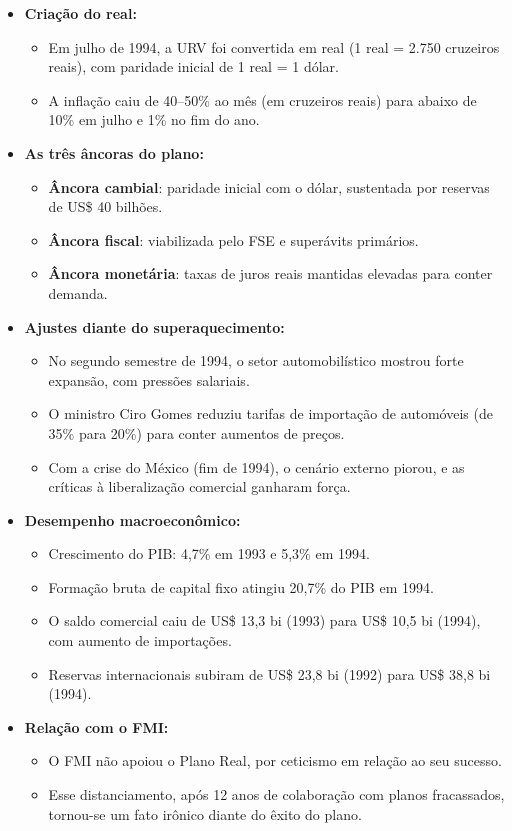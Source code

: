 \documentclass[a4paper,12pt]{article}[abntex2]
\begin{document}
\begin{itemize}
    \item \textbf{Criação do real:}
    \begin{itemize}
        \item Em julho de 1994, a URV foi convertida em real (1 real = 2.750 cruzeiros reais), com paridade inicial de 1 real = 1 dólar.
        \item A inflação caiu de 40--50\% ao mês (em cruzeiros reais) para abaixo de 10\% em julho e 1\% no fim do ano.
    \end{itemize}

    \item \textbf{As três âncoras do plano:}
    \begin{itemize}
        \item \textbf{Âncora cambial}: paridade inicial com o dólar, sustentada por reservas de US\$ 40 bilhões.
        \item \textbf{Âncora fiscal}: viabilizada pelo FSE e superávits primários.
        \item \textbf{Âncora monetária}: taxas de juros reais mantidas elevadas para conter demanda.
    \end{itemize}

    \item \textbf{Ajustes diante do superaquecimento:}
    \begin{itemize}
        \item No segundo semestre de 1994, o setor automobilístico mostrou forte expansão, com pressões salariais.
        \item O ministro Ciro Gomes reduziu tarifas de importação de automóveis (de 35\% para 20\%) para conter aumentos de preços.
        \item Com a crise do México (fim de 1994), o cenário externo piorou, e as críticas à liberalização comercial ganharam força.
    \end{itemize}

    \item \textbf{Desempenho macroeconômico:}
    \begin{itemize}
        \item Crescimento do PIB: 4,7\% em 1993 e 5,3\% em 1994.
        \item Formação bruta de capital fixo atingiu 20,7\% do PIB em 1994.
        \item O saldo comercial caiu de US\$ 13,3 bi (1993) para US\$ 10,5 bi (1994), com aumento de importações.
        \item Reservas internacionais subiram de US\$ 23,8 bi (1992) para US\$ 38,8 bi (1994).
    \end{itemize}

    \item \textbf{Relação com o FMI:}
    \begin{itemize}
        \item O FMI não apoiou o Plano Real, por ceticismo em relação ao seu sucesso.
        \item Esse distanciamento, após 12 anos de colaboração com planos fracassados, tornou-se um fato irônico diante do êxito do plano.
    \end{itemize}

\end{itemize}
\end{document}
